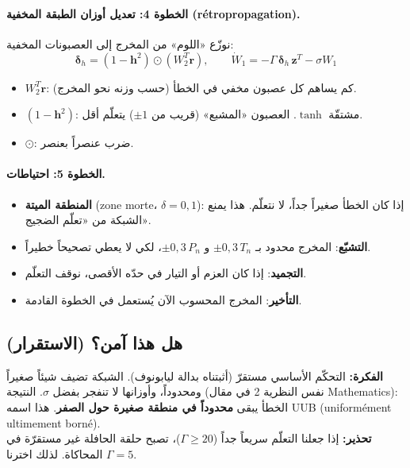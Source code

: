 \documentclass[11pt,a4paper]{article}
\newcommand{\fr}[1]{\textfrench{#1}}
\newcommand{\bv}[1]{\boldsymbol{#1}}
\newcommand{\Fikra}{\textbf{الفكرة: }}
\begin{document}
\paragraph{الخطوة 4: تعديل أوزان الطبقة المخفية (\fr{rétropropagation}).}
نوزّع «اللوم» من المخرج إلى العصبونات المخفية:
\begin{equation}
\bv{\delta}_h = (1-\bv{h}^2)\odot(W_2^T\bv{r}),\qquad \dot W_1 = -\Gamma\,\bv{\delta}_h\,\bv{z}^T - \sigma W_1
\end{equation}
\begin{itemize}
\item $W_2^T\bv{r}$: كم يساهم كل عصبون مخفي في الخطأ (حسب وزنه نحو المخرج).
\item $(1-\bv{h}^2)$: مشتقّة $\tanh$. العصبون «المشبع» (قريب من $\pm1$) يتعلّم أقل.
\item $\odot$: ضرب عنصراً بعنصر.
\end{itemize}

\paragraph{الخطوة 5: احتياطات.}
\begin{itemize}
\item \textbf{المنطقة الميتة} (\fr{zone morte}، $\delta = 0{,}1$): إذا كان الخطأ صغيراً جداً، لا نتعلّم.
هذا يمنع الشبكة من «تعلّم الضجيج».
\item \textbf{التشبّع}: المخرج محدود بـ $\pm 0{,}3\,T_n$ و $\pm 0{,}3\,P_n$، لكي لا يعطي تصحيحاً خطيراً.
\item \textbf{التجميد}: إذا كان العزم أو التيار في حدّه الأقصى، نوقف التعلّم.
\item \textbf{التأخير}: المخرج المحسوب الآن يُستعمل في الخطوة القادمة.
\end{itemize}

\subsection{هل هذا آمن؟ (الاستقرار)}
\begin{fikra}
\Fikra
التحكّم الأساسي مستقرّ (أثبتناه بدالة ليابونوف). الشبكة تضيف شيئاً صغيراً ومحدوداً، وأوزانها لا تنفجر
بفضل $\sigma$. النتيجة (نفس النظرية 2 في مقال \fr{Mathematics}): الخطأ يبقى \textbf{محدوداً في
منطقة صغيرة حول الصفر}. هذا اسمه \fr{UUB} (\fr{uniformément ultimement borné}).\\
\textbf{تحذير:} إذا جعلنا التعلّم سريعاً جداً ($\Gamma\ge 20$)، تصبح حلقة الحافلة غير مستقرّة في المحاكاة.
لذلك اخترنا $\Gamma = 5$.
\end{fikra}
\end{document}
